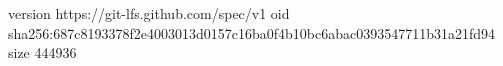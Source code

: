 version https://git-lfs.github.com/spec/v1
oid sha256:687c8193378f2e4003013d0157c16ba0f4b10bc6abac0393547711b31a21fd94
size 444936
